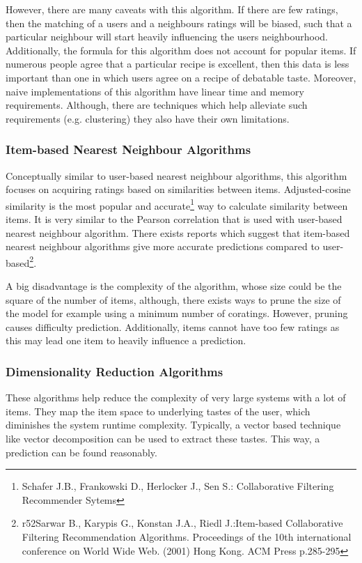 However, there are many caveats with this algorithm. If there are few ratings, then the matching of a users and a neighbours ratings will be biased, such that a particular neighbour will start heavily influencing the users neighbourhood. Additionally, the formula for this algorithm does not account for popular items. If numerous people agree that a particular recipe is excellent, then this data is less important than one in which users agree on a recipe of debatable taste. Moreover, naive implementations of this algorithm have linear time and memory requirements. Although, there are techniques which help alleviate such requirements (e.g. clustering) they also have their own limitations.

\subsubsection{Item-based Nearest Neighbour Algorithms}

 Conceptually similar to user-based nearest neighbour algorithms, this algorithm focuses on acquiring ratings based on similarities between items. Adjusted-cosine similarity is the most popular and accurate\footnote{Schafer J.B., Frankowski D., Herlocker J., Sen S.: Collaborative Filtering Recommender Sytems} way to calculate similarity between items. It is very similar to the Pearson correlation that is used with user-based nearest neighbour algorithm. There exists reports which suggest that item-based nearest neighbour algorithms give more accurate predictions compared to user-based\footnote{r52Sarwar B., Karypis G., Konstan J.A., Riedl J.:Item-based Collaborative Filtering Recommendation Algorithms. Proceedings of the 10th international conference on World Wide Web. (2001) Hong Kong. ACM Press p.285-295}.

A big disadvantage is the complexity of the algorithm, whose size could be the square of the number of items, although, there exists ways to prune the size of the model for example using a minimum number of coratings. However, pruning causes difficulty prediction. Additionally, items cannot have too few ratings as this may lead one item to heavily influence a prediction.

\subsubsection{Dimensionality Reduction Algorithms}

These algorithms help reduce the complexity of very large systems with a lot of items. They map the item space to underlying tastes of the user, which diminishes the system runtime complexity. Typically, a vector based technique like vector decomposition can be used to extract these tastes. This way, a prediction can be found reasonably.


